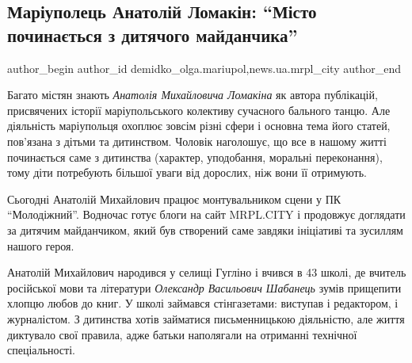  
 
 
 
 
 
\subsection{Маріуполець Анатолій Ломакін: \enquote{Місто починається з дитячого майданчика}}
\label{sec:10_08_2020.stz.news.ua.mrpl_city.1.anatolij_lomakin_misto_pochyn_dyt_majdanchyk}
 
\ifcmt
 author_begin
   author_id demidko_olga.mariupol,news.ua.mrpl_city
 author_end
\fi


Багато містян знають \emph{Анатолія Михайловича Ломакіна} як автора публікацій,
присвячених історії маріупольського колективу сучасного бального танцю. Але
діяльність маріупольця охоплює зовсім різні сфери і основна тема його статей,
пов'язана з дітьми та дитинством. Чоловік наголошує, що все в нашому житті
починається саме з дитинства (характер, уподобання, моральні переконання), тому
діти потребують більшої уваги від дорослих, ніж вони її отримують.

Сьогодні Анатолій Михайлович працює монтувальником сцени у ПК \enquote{Молодіжний}.
Водночас готує блоги на сайт MRPL.CITY і продовжує доглядати за дитячим
майданчиком, який був створений саме завдяки ініціативі та зусиллям нашого
героя.

Анатолій Михайлович народився у селищі Гугліно і вчився в 43 школі, де вчитель
російської мови та літератури \emph{Олександр Васильович Шабанець} зумів прищепити
хлопцю любов до книг. У школі займався стінгазетами: виступав і редактором, і
журналістом. З дитинства хотів займатися письменницькою діяльністю, але життя
диктувало свої правила, адже батьки наполягали на отриманні технічної
спеціальності.

